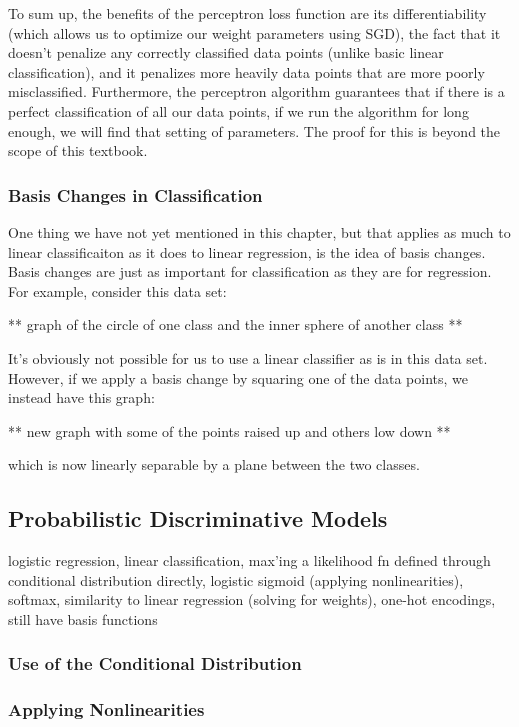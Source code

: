 To sum up, the benefits of the perceptron loss function are its differentiability (which allows us to optimize our weight parameters using SGD), the fact that it doesn't penalize any correctly classified data points (unlike basic linear classification), and it penalizes more heavily data points that are more poorly misclassified. Furthermore, the perceptron algorithm guarantees that if there is a perfect classification of all our data points, if we run the algorithm for long enough, we will find that setting of parameters. The proof for this is beyond the scope of this textbook.

\subsubsection{Basis Changes in Classification}
One thing we have not yet mentioned in this chapter, but that applies as much to linear classificaiton as it does to linear regression, is the idea of basis changes. Basis changes are just as important for classification as they are for regression. For example, consider this data set:

** graph of the circle of one class and the inner sphere of another class **

It's obviously not possible for us to use a linear classifier as is in this data set. However, if we apply a basis change by squaring one of the data points, we instead have this graph:

** new graph with some of the points raised up and others low down **

which is now linearly separable by a plane between the two classes.

\subsection{Probabilistic Discriminative Models}
logistic regression, linear classification, max'ing a likelihood fn defined through conditional distribution directly, logistic sigmoid (applying nonlinearities), softmax, similarity to linear regression (solving for weights), one-hot encodings, still have basis functions

\subsubsection{Use of the Conditional Distribution}
\subsubsection{Applying Nonlinearities}
